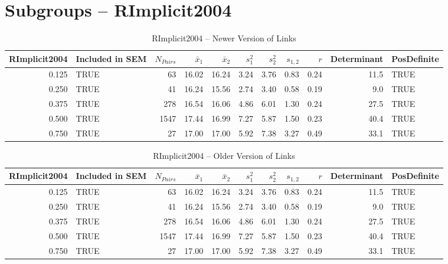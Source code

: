 \documentclass{article}\usepackage[]{graphicx}\usepackage[]{color}
\begin{document}
\section{Subgroups --  RImplicit2004 }%
\begin{table}[ht]
\centering
\begin{tabular}{rlrrrrrrrrl}
  \hline
RImplicit2004 & Included in SEM & $N_{Pairs}$ & $\bar{x}_1$ & $\bar{x}_2$ & $s_1^2$ & $s_2^2$ & $s_{1,2}$ & $r$ & Determinant & PosDefinite \\ 
  \hline
0.125 & TRUE & 63 & 16.02 & 16.24 & 3.24 & 3.76 & 0.83 & 0.24 & 11.5 & TRUE \\ 
  0.250 & TRUE & 41 & 16.24 & 15.56 & 2.74 & 3.40 & 0.58 & 0.19 & 9.0 & TRUE \\ 
  0.375 & TRUE & 278 & 16.54 & 16.06 & 4.86 & 6.01 & 1.30 & 0.24 & 27.5 & TRUE \\ 
  0.500 & TRUE & 1547 & 17.44 & 16.99 & 7.27 & 5.87 & 1.50 & 0.23 & 40.4 & TRUE \\ 
  0.750 & TRUE & 27 & 17.00 & 17.00 & 5.92 & 7.38 & 3.27 & 0.49 & 33.1 & TRUE \\ 
   \hline
\end{tabular}
\caption{RImplicit2004 -- Newer Version of Links} 
\end{table}
\begin{table}[ht]
\centering
\begin{tabular}{rlrrrrrrrrl}
  \hline
RImplicit2004 & Included in SEM & $N_{Pairs}$ & $\bar{x}_1$ & $\bar{x}_2$ & $s_1^2$ & $s_2^2$ & $s_{1,2}$ & $r$ & Determinant & PosDefinite \\ 
  \hline
0.125 & TRUE & 63 & 16.02 & 16.24 & 3.24 & 3.76 & 0.83 & 0.24 & 11.5 & TRUE \\ 
  0.250 & TRUE & 41 & 16.24 & 15.56 & 2.74 & 3.40 & 0.58 & 0.19 & 9.0 & TRUE \\ 
  0.375 & TRUE & 278 & 16.54 & 16.06 & 4.86 & 6.01 & 1.30 & 0.24 & 27.5 & TRUE \\ 
  0.500 & TRUE & 1547 & 17.44 & 16.99 & 7.27 & 5.87 & 1.50 & 0.23 & 40.4 & TRUE \\ 
  0.750 & TRUE & 27 & 17.00 & 17.00 & 5.92 & 7.38 & 3.27 & 0.49 & 33.1 & TRUE \\ 
   \hline
\end{tabular}
\caption{RImplicit2004 -- Older Version of Links} 
\end{table}
\end{document}
